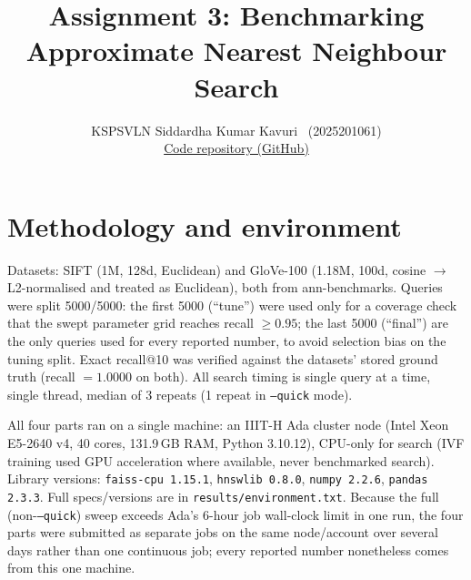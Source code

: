 \documentclass[10pt]{article}
\title{\vspace{-1.3cm}\large Assignment 3: Benchmarking Approximate Nearest Neighbour Search}
\author{KSPSVLN Siddardha Kumar Kavuri \ (2025201061) \\ \small \href{https://github.com/siddardhakumar2003/Information-Retrieval-Extraction/tree/main/Assignment-3}{Code repository (GitHub)}}
\begin{document}
\maketitle
\vspace{-0.9cm}

\section*{Methodology and environment}
\small
Datasets: SIFT (1M, 128d, Euclidean) and GloVe-100 (1.18M, 100d, cosine $\to$ L2-normalised and
treated as Euclidean), both from ann-benchmarks. Queries were split 5000/5000: the first 5000
(``tune'') were used only for a coverage check that the swept parameter grid reaches recall
$\geq 0.95$; the last 5000 (``final'') are the only queries used for every reported number, to
avoid selection bias on the tuning split. Exact recall@10 was verified against the datasets'
stored ground truth (recall $=1.0000$ on both). All search timing is single query at a time,
single thread, median of 3 repeats (1 repeat in \texttt{--quick} mode).

All four parts ran on a single machine: an IIIT-H Ada cluster node (Intel Xeon E5-2640 v4,
40 cores, 131.9\,GB RAM, Python 3.10.12), CPU-only for search (IVF training used GPU
acceleration where available, never benchmarked search). Library versions:
\texttt{faiss-cpu 1.15.1}, \texttt{hnswlib 0.8.0}, \texttt{numpy 2.2.6}, \texttt{pandas 2.3.3}.
Full specs/versions are in \texttt{results/environment.txt}. Because the full (non-\texttt{--quick})
sweep exceeds Ada's 6-hour job wall-clock limit in one run, the four parts were submitted as
separate jobs on the same node/account over several days rather than one continuous job; every
reported number nonetheless comes from this one machine.
\end{document}
